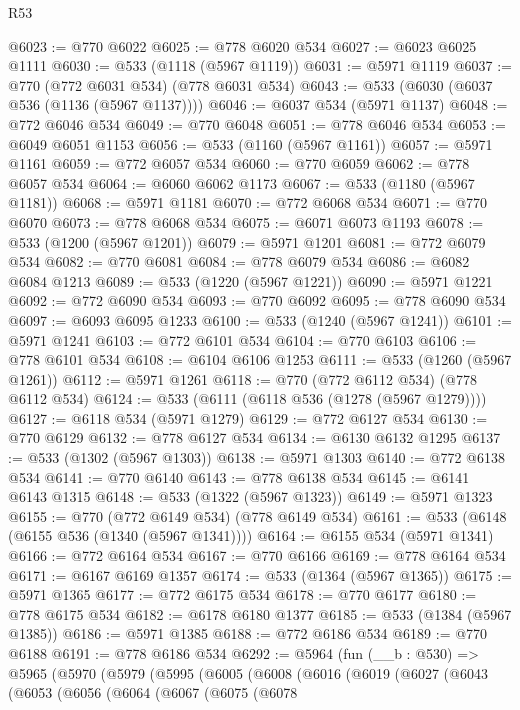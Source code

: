 \begin{lexlean}{R53}
\begin{coremodule}
@6023 := @770 @6022
@6025 := @778 @6020 @534
@6027 := @6023 @6025 @1111
@6030 := @533 (@1118 (@5967 @1119))
@6031 := @5971 @1119
@6037 := @770 (@772 @6031 @534) (@778 @6031 @534)
@6043 := @533 (@6030 (@6037 @536 (@1136 (@5967 @1137))))
@6046 := @6037 @534 (@5971 @1137)
@6048 := @772 @6046 @534
@6049 := @770 @6048
@6051 := @778 @6046 @534
@6053 := @6049 @6051 @1153
@6056 := @533 (@1160 (@5967 @1161))
@6057 := @5971 @1161
@6059 := @772 @6057 @534
@6060 := @770 @6059
@6062 := @778 @6057 @534
@6064 := @6060 @6062 @1173
@6067 := @533 (@1180 (@5967 @1181))
@6068 := @5971 @1181
@6070 := @772 @6068 @534
@6071 := @770 @6070
@6073 := @778 @6068 @534
@6075 := @6071 @6073 @1193
@6078 := @533 (@1200 (@5967 @1201))
@6079 := @5971 @1201
@6081 := @772 @6079 @534
@6082 := @770 @6081
@6084 := @778 @6079 @534
@6086 := @6082 @6084 @1213
@6089 := @533 (@1220 (@5967 @1221))
@6090 := @5971 @1221
@6092 := @772 @6090 @534
@6093 := @770 @6092
@6095 := @778 @6090 @534
@6097 := @6093 @6095 @1233
@6100 := @533 (@1240 (@5967 @1241))
@6101 := @5971 @1241
@6103 := @772 @6101 @534
@6104 := @770 @6103
@6106 := @778 @6101 @534
@6108 := @6104 @6106 @1253
@6111 := @533 (@1260 (@5967 @1261))
@6112 := @5971 @1261
@6118 := @770 (@772 @6112 @534) (@778 @6112 @534)
@6124 := @533 (@6111 (@6118 @536 (@1278 (@5967 @1279))))
@6127 := @6118 @534 (@5971 @1279)
@6129 := @772 @6127 @534
@6130 := @770 @6129
@6132 := @778 @6127 @534
@6134 := @6130 @6132 @1295
@6137 := @533 (@1302 (@5967 @1303))
@6138 := @5971 @1303
@6140 := @772 @6138 @534
@6141 := @770 @6140
@6143 := @778 @6138 @534
@6145 := @6141 @6143 @1315
@6148 := @533 (@1322 (@5967 @1323))
@6149 := @5971 @1323
@6155 := @770 (@772 @6149 @534) (@778 @6149 @534)
@6161 := @533 (@6148 (@6155 @536 (@1340 (@5967 @1341))))
@6164 := @6155 @534 (@5971 @1341)
@6166 := @772 @6164 @534
@6167 := @770 @6166
@6169 := @778 @6164 @534
@6171 := @6167 @6169 @1357
@6174 := @533 (@1364 (@5967 @1365))
@6175 := @5971 @1365
@6177 := @772 @6175 @534
@6178 := @770 @6177
@6180 := @778 @6175 @534
@6182 := @6178 @6180 @1377
@6185 := @533 (@1384 (@5967 @1385))
@6186 := @5971 @1385
@6188 := @772 @6186 @534
@6189 := @770 @6188
@6191 := @778 @6186 @534
@6292 := @5964
    (fun (__b : @530) =>
    @5965
      (@5970
        (@5979
          (@5995
            (@6005
              (@6008
                (@6016
                  (@6019
                    (@6027
                      (@6043
                        (@6053
                          (@6056
                            (@6064
                              (@6067
                                (@6075
                                  (@6078

\end{coremodule}
\end{lexlean}
